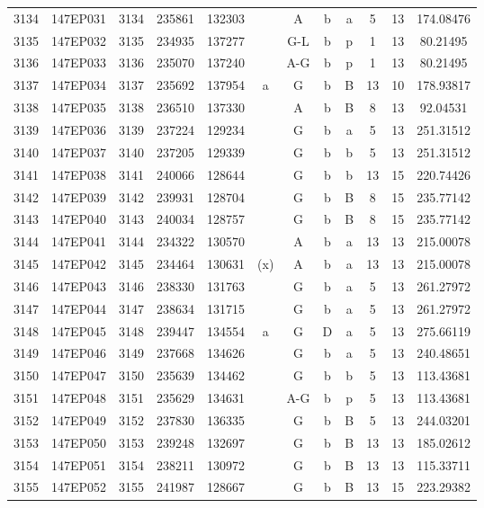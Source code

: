 \begin{tabular}{|*{12}{c|}}
3134 & 147EP031 & 3134 & 235861 & 132303 &  & A & b & a & 5 & 13 & 174.08476 \\ 
3135 & 147EP032 & 3135 & 234935 & 137277 &  & G-L & b & p & 1 & 13 & 80.21495 \\ 
3136 & 147EP033 & 3136 & 235070 & 137240 &  & A-G & b & p & 1 & 13 & 80.21495 \\ 
3137 & 147EP034 & 3137 & 235692 & 137954 & a & G & b & B & 13 & 10 & 178.93817 \\ 
3138 & 147EP035 & 3138 & 236510 & 137330 &  & A & b & B & 8 & 13 & 92.04531 \\ 
3139 & 147EP036 & 3139 & 237224 & 129234 &  & G & b & a & 5 & 13 & 251.31512 \\ 
3140 & 147EP037 & 3140 & 237205 & 129339 &  & G & b & b & 5 & 13 & 251.31512 \\ 
3141 & 147EP038 & 3141 & 240066 & 128644 &  & G & b & b & 13 & 15 & 220.74426 \\ 
3142 & 147EP039 & 3142 & 239931 & 128704 &  & G & b & B & 8 & 15 & 235.77142 \\ 
3143 & 147EP040 & 3143 & 240034 & 128757 &  & G & b & B & 8 & 15 & 235.77142 \\ 
3144 & 147EP041 & 3144 & 234322 & 130570 &  & A & b & a & 13 & 13 & 215.00078 \\ 
3145 & 147EP042 & 3145 & 234464 & 130631 & (x) & A & b & a & 13 & 13 & 215.00078 \\ 
3146 & 147EP043 & 3146 & 238330 & 131763 &  & G & b & a & 5 & 13 & 261.27972 \\ 
3147 & 147EP044 & 3147 & 238634 & 131715 &  & G & b & a & 5 & 13 & 261.27972 \\ 
3148 & 147EP045 & 3148 & 239447 & 134554 & a & G & D & a & 5 & 13 & 275.66119 \\ 
3149 & 147EP046 & 3149 & 237668 & 134626 &  & G & b & a & 5 & 13 & 240.48651 \\ 
3150 & 147EP047 & 3150 & 235639 & 134462 &  & G & b & b & 5 & 13 & 113.43681 \\ 
3151 & 147EP048 & 3151 & 235629 & 134631 &  & A-G & b & p & 5 & 13 & 113.43681 \\ 
3152 & 147EP049 & 3152 & 237830 & 136335 &  & G & b & B & 5 & 13 & 244.03201 \\ 
3153 & 147EP050 & 3153 & 239248 & 132697 &  & G & b & B & 13 & 13 & 185.02612 \\ 
3154 & 147EP051 & 3154 & 238211 & 130972 &  & G & b & B & 13 & 13 & 115.33711 \\ 
3155 & 147EP052 & 3155 & 241987 & 128667 &  & G & b & B & 13 & 15 & 223.29382 \\ 

\end{tabular}
